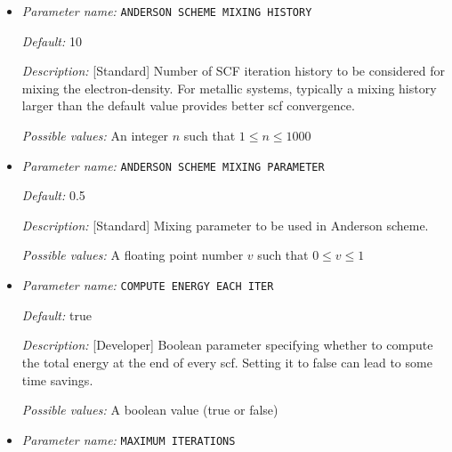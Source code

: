 \begin{itemize}
\item {\it Parameter name:} {\tt ANDERSON SCHEME MIXING HISTORY}
\label{parameters:SCF parameters/ANDERSON SCHEME MIXING HISTORY}
\label{parameters:SCF_20parameters/ANDERSON_20SCHEME_20MIXING_20HISTORY}




{\it Default:} 10


{\it Description:} [Standard] Number of SCF iteration history to be considered for mixing the electron-density. For metallic systems, typically a mixing history larger than the default value provides better scf convergence.


{\it Possible values:} An integer $n$ such that $1\leq n \leq 1000$
\item {\it Parameter name:} {\tt ANDERSON SCHEME MIXING PARAMETER}
\label{parameters:SCF parameters/ANDERSON SCHEME MIXING PARAMETER}
\label{parameters:SCF_20parameters/ANDERSON_20SCHEME_20MIXING_20PARAMETER}




{\it Default:} 0.5


{\it Description:} [Standard] Mixing parameter to be used in Anderson scheme.


{\it Possible values:} A floating point number $v$ such that $0 \leq v \leq 1$
\item {\it Parameter name:} {\tt COMPUTE ENERGY EACH ITER}
\label{parameters:SCF parameters/COMPUTE ENERGY EACH ITER}
\label{parameters:SCF_20parameters/COMPUTE_20ENERGY_20EACH_20ITER}




{\it Default:} true


{\it Description:} [Developer] Boolean parameter specifying whether to compute the total energy at the end of every scf. Setting it to false can lead to some time savings.


{\it Possible values:} A boolean value (true or false)
\item {\it Parameter name:} {\tt MAXIMUM ITERATIONS}
\label{parameters:SCF parameters/MAXIMUM ITERATIONS}
\label{parameters:SCF_20parameters/MAXIMUM_20ITERATIONS}



\end{itemize}

